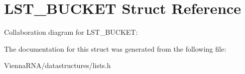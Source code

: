\hypertarget{structLST__BUCKET}{}\section{L\+S\+T\+\_\+\+B\+U\+C\+K\+ET Struct Reference}
\label{structLST__BUCKET}


Collaboration diagram for L\+S\+T\+\_\+\+B\+U\+C\+K\+ET\+:


The documentation for this struct was generated from the following file\+:\begin{DoxyCompactItemize}
\item 
Vienna\+R\+N\+A/datastructures/lists.\+h\end{DoxyCompactItemize}
